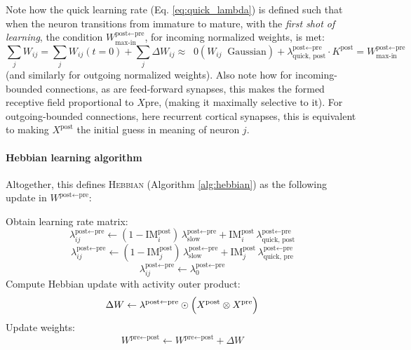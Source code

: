 \documentclass{article}
\begin{document}
Note how the quick learning rate (Eq. \eqref{eq:quick_lambda}) is defined such that when the neuron transitions from immature to mature, with the  \textit{first shot of learning}, the condition $W^{\textrm{post}\leftarrow\textrm{pre}}_\textrm{max-in}$, for incoming normalized weights, is met:
\begin{equation}
    \sum_j W_{ij} = \sum_j W_{ij}(t = 0) + \sum_j \Delta W_{ij} \approx \;\; 0 (W_{ij} \;\; \textrm{Gaussian})  +\lambda^{\textrm{post}\leftarrow\textrm{pre}}_\textrm{quick, post}\cdot K^\textrm{post} = W^{\textrm{post}\leftarrow\textrm{pre}}_\textrm{max-in}
\end{equation}
(and similarly for outgoing normalized weights). Also note how for incoming-bounded connections, as are feed-forward synapses, this makes the formed receptive field proportional to $X\textrm{pre}$, (making it maximally selective to it). For outgoing-bounded connections, here recurrent cortical synapses, this is equivalent to making $X^\textrm{post}$ the initial guess in meaning of neuron $j$.
\paragraph*{Hebbian learning algorithm}
Altogether, this defines \textsc{Hebbian} (Algorithm \ref{alg:hebbian}) as the following update in $W^{\textrm{post} \leftarrow \textrm{pre}}$:
\begin{algorithm}
\caption{Hebbian Learning}\label{alg:hebbian}
\begin{algorithmic}[1]
    \State Obtain learning rate matrix:
        \[
            \lambda_{ij}^{\textrm{post} \leftarrow \textrm{pre}}
            \gets
            (1-\textrm{IM}^\textrm{post}_i)\,\lambda^{\textrm{post} \leftarrow \textrm{pre}}_\textrm{slow}
            + \textrm{IM}^\textrm{post}_i\,\lambda^{\textrm{post}\leftarrow\textrm{pre}}_{\textrm{quick, post}}
        \]
        \[
            \lambda_{ij}^{\textrm{post} \leftarrow \textrm{pre}}
            \gets
            (1-\textrm{IM}^\textrm{post}_j)\,\lambda^{\textrm{post} \leftarrow \textrm{pre}}_\textrm{slow}
            + \textrm{IM}^\textrm{post}_j\,\lambda^{\textrm{post}\leftarrow\textrm{pre}}_{\textrm{quick, pre}}
        \]
    \Else
        \[
            \lambda_{ij}^{\textrm{post} \leftarrow \textrm{pre}} 
            \gets 
            \lambda^{\textrm{post}\leftarrow\textrm{pre}}_0
        \]
    \EndIf
    \State Compute Hebbian update with activity outer product:
        \[
            \Delta W \gets \lambda^{\textrm{post} \leftarrow \textrm{pre}} \odot 
            \Bigl(X^{\textrm{post}} \otimes X^{\textrm{pre}}\Bigr)
        \]
    \State Update weights:
        \[
            W^{\textrm{pre} \leftarrow \textrm{post}} 
            \gets 
            W^{\textrm{pre} \leftarrow \textrm{post}} + \Delta W
        \]
\EndFunction
\end{algorithmic}
\end{algorithm}
\end{document}
